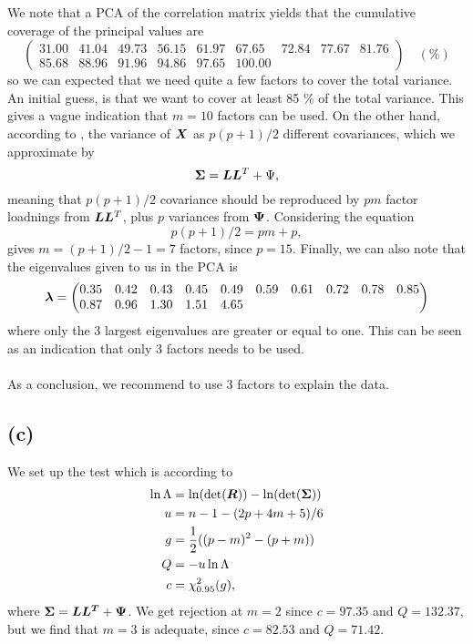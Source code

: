 We note that a PCA of the correlation matrix yields that the cumulative
coverage of the principal values are 
\begin{equation*}
  \begin{pmatrix}
    31.00 &41.04 &49.73 &56.15 &61.97 &67.65 &72.84 &77.67 &81.76\\
    85.68 &88.96 &91.96 &94.86 &97.65 &100.00 
  \end{pmatrix}\quad (\%)
\end{equation*}
so we can expected that we need quite a few factors to cover the total
variance.  An initial guess, is that we want to cover at least 85 \% of
the total variance. This gives a vague indication that $m = 10$
factors can be used. On the other hand, according to
\cite[p. 485]{book}, the variance of $\bm{X}$ as $p(p+1)/2$ different
covariances, which we approximate by
\begin{equation*}
  \bm{\Sigma} = \bm{L} \bm{L}^{T} + \Psi,
\end{equation*}
meaning that $p(p+1)/2$ covariance should be reproduced by $pm$ factor
loadnings from $\bm{L} \bm{L}^{T}$, plus $p$ variances from $\bm{\Psi}$. Considering the equation 
\begin{equation*}
  p(p + 1)/2 = pm + p,
\end{equation*}
gives $m =(p + 1)/2 - 1 = 7 $ factors, since $p = 15$. Finally, we can
also note that the eigenvalues given to us in the PCA is
\begin{equation*}
  \bm{\lambda} =
  \begin{pmatrix}
    0.35 &0.42 &0.43 &0.45 &0.49 &0.59 &0.61 &0.72 &0.78 &0.85 \\ 0.87 &0.96 &1.30 &1.51 &4.65 
  \end{pmatrix}
\end{equation*}
where only the 3 largest eigenvalues are greater or equal to one. This
can be seen as an indication that only 3 factors needs to be used. \\
\\
As a conclusion, we recommend to use 3 factors to explain the data.
\subsection*{(c)}
\label{sec:c-8}
 We set up the test which is
according to \cite[p. 502]{book}
\begin{align*}
  \ln \Lambda &= \ln(\det(\bm{R})) - \ln(\det(\bm{\Sigma})) \\
  u &=  n - 1 -(2p+4m+5)/6 \\
  g &= \frac 12 ((p-m)^2 - (p+m)) \\
  Q &= -u \ln \Lambda \\
  c &=  \chi^2_{0.95}(g),
\end{align*}
where $\bm{\Sigma} = \bm{LL^T} + \bm{\Psi}$. We get rejection at
$m = 2$ since $c = 97.35$ and $Q = 132.37$, but we find that $m = 3$
is adequate, since $c = 82.53$ and $Q = 71.42$. 
